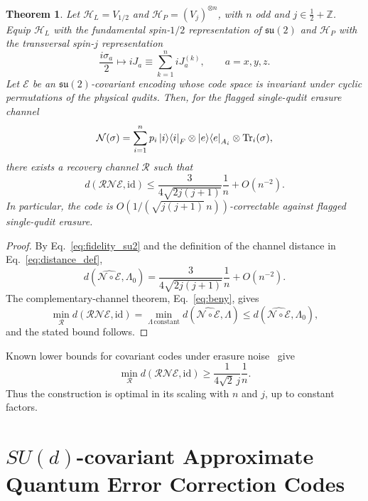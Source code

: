 \documentclass[10pt,twocolumn,superscriptaddress,aps,amsmath,amssymb,citeautoscript,floatfix,prx]{revtex4-2}
\newtheorem{theorem}{Theorem}
\theoremstyle{plain}
\theoremstyle{plain}
\theoremstyle{plain}
\theoremstyle{plain}
\theoremstyle{plain}
\theoremstyle{plain}
\begin{document}
\begin{theorem}\label{thrm:su2scale}
Let $\mathcal H_L=V_{1/2}$ and $\mathcal H_P=(V_j)^{\otimes n}$, with $n$ odd and $j\in\frac12+\mathbb Z$. Equip $\mathcal H_L$ with the fundamental spin-$1/2$ representation of $\mathfrak{su}(2)$ and $\mathcal H_P$ with the transversal spin-$j$ representation
\begin{equation}
    \frac{i\sigma_a}{2}
    \longmapsto
    iJ_a
    \equiv
    \sum_{k=1}^n iJ_a^{(k)},
    \qquad a=x,y,z .
\end{equation}
Let $\mathcal E$ be an $\mathfrak{su}(2)$-covariant encoding whose code space is invariant under cyclic permutations of the physical qudits. Then, for the flagged single-qudit erasure channel
\[
    \mathcal N(\sigma)
    =
    \sum_{i=1}^n p_i\ket i\!\bra i_F
    \otimes \ket e\!\bra e_{A_i}
    \otimes \operatorname{Tr}_i(\sigma),
\]
there exists a recovery channel $\mathcal R$ such that
\[
    d(\mathcal R\mathcal N\mathcal E,\mathrm{id})
    \le
    \frac{3}{4\sqrt{2j(j+1)}}\frac{1}{n}
    +O(n^{-2}) .
\]
In particular, the code is $O\!\left(1/(\sqrt{j(j+1)}\,n)\right)$-correctable against flagged single-qudit erasure.
\end{theorem}

\begin{proof}
By Eq.~\eqref{eq:fidelity_su2} and the definition of the channel distance in Eq.~\eqref{eq:distance_def},
\[
    d\!\left(\widehat{\mathcal N\circ\mathcal E},\Lambda_0\right)
    =
    \frac{3}{4\sqrt{2j(j+1)}}\frac{1}{n}
    +O(n^{-2}) .
\]
The complementary-channel theorem, Eq.~\eqref{eq:beny}, gives
\[
    \min_{\mathcal R}
    d(\mathcal R\mathcal N\mathcal E,\mathrm{id})
    =
    \min_{\Lambda\,\mathrm{constant}}
    d\!\left(\widehat{\mathcal N\circ\mathcal E},\Lambda\right)
    \le
    d\!\left(\widehat{\mathcal N\circ\mathcal E},\Lambda_0\right),
\]
and the stated bound follows.
\end{proof}

Known lower bounds for covariant codes under erasure noise~\cite{Faist2020} give
\[
    \min_{\mathcal R}
    d(\mathcal R\mathcal N\mathcal E,\mathrm{id})
    \ge
    \frac{1}{4\sqrt{2}\,j}\frac{1}{n} .
\]
Thus the construction is optimal in its scaling with $n$ and $j$, up to constant factors.


\section{\texorpdfstring{$SU(d)$}{SU(d)}-covariant Approximate Quantum Error Correction Codes}\label{sec:main_sud}
\end{document}
